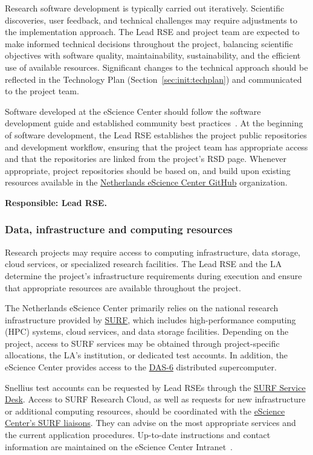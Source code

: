 Research software development is typically carried out iteratively. Scientific discoveries, user feedback, and
technical challenges may require adjustments to the implementation approach. The Lead RSE and project team are expected
to make informed technical decisions throughout the project, balancing scientific objectives with software quality,
maintainability, sustainability, and the efficient use of available resources. Significant changes to the technical 
approach should be reflected in the Technology Plan (Section~\ref{sec:init:techplan}) and communicated to the project 
team. 

Software developed at the eScience Center should follow the software development guide and established community best
practices~\cite{guide-nlesc,the_turing_way-2023}. At the beginning of software development, the Lead RSE establishes 
the project public repositories and development workflow, ensuring that the project team has appropriate access and 
that the repositories are linked from the project's RSD page.  Whenever appropriate, project repositories should be 
based on, and build upon existing resources available in the 
\href{https://github.com/nlesc}{⁠Netherlands eScience Center GitHub} organization. 

\textbf{Responsible: Lead RSE.}

\subsubsection{Data, infrastructure and computing resources}
\label{sec:exec:resources}

Research projects may require access to computing infrastructure, data storage, cloud services, or specialized research
facilities. The Lead RSE and the LA determine the project's infrastructure requirements during execution and ensure that
appropriate resources are available throughout the project.

The Netherlands eScience Center primarily relies on the national research infrastructure provided by
\href{https://www.surf.nl/en/themes/research-infrastructure}{SURF}, which includes high-performance computing (HPC)
systems, cloud services, and data storage facilities. Depending on the project, access to SURF services may be obtained
through project-specific allocations, the LA's institution, or dedicated test accounts. In addition, the eScience 
Center provides access to the \href{https://www.cs.vu.nl/das6/home.shtml}{DAS-6} distributed supercomputer. 

Snellius test accounts can be requested by Lead RSEs through the \href{https://servicedesk.surf.nl/}{SURF Service Desk}. 
Access to SURF Research Cloud, as well as requests for new infrastructure or additional computing resources, should be 
coordinated with the \href{liaison@esciencecenter.nl}{eScience Center's SURF liaisons}. They can advise on the most 
appropriate services and the current application procedures. Up-to-date instructions and contact information are 
maintained on the eScience Center Intranet~\cite{intranet}.

